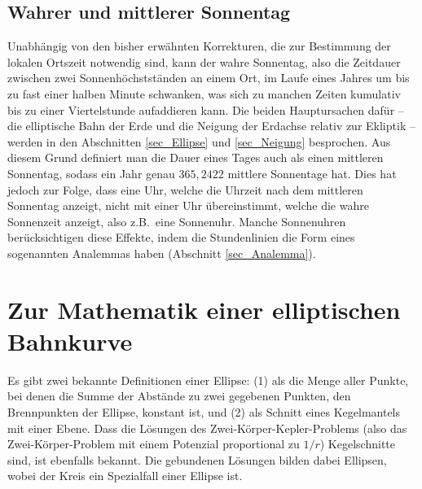 \subsection{Wahrer und mittlerer Sonnentag}
\label{sec_wahrerSonnentag}

Unabh\"angig von den bisher erw\"ahnten Korrekturen, die zur Bestimmung der lokalen
Ortszeit notwendig sind, kann der wahre Sonnentag, also die Zeitdauer zwischen zwei 
Sonnenh\"ochstst\"anden an einem Ort, im Laufe eines Jahres um bis zu fast einer halben Minute
schwanken, was sich zu manchen Zeiten kumulativ bis zu einer Viertelstunde aufaddieren kann. 
Die beiden Hauptursachen daf\"ur -- die elliptische Bahn der Erde und die Neigung der Erdachse 
relativ zur Ekliptik -- werden in den Abschnitten \ref{sec_Ellipse} und \ref{sec_Neigung} besprochen. 
Aus diesem Grund definiert man die Dauer eines Tages auch als einen mittleren 
Sonnentag, 
sodass ein Jahr
genau $365,2422$ mittlere Sonnentage hat. Dies hat jedoch zur Folge, dass eine
Uhr, welche die Uhrzeit nach dem mittleren Sonnentag anzeigt, nicht mit einer Uhr \"ubereinstimmt,
welche die wahre Sonnenzeit anzeigt, also z.B.\ eine Sonnenuhr. 
Manche Sonnenuhren
ber\"ucksichtigen diese Effekte, indem die Stundenlinien die Form eines sogenannten
Analemmas haben (Abschnitt \ref{sec_Analemma}).

\section{Zur Mathematik einer elliptischen Bahnkurve}

Es gibt zwei bekannte Definitionen einer Ellipse: 
(1) als die Menge aller Punkte, bei denen die
Summe der Abst\"ande zu zwei gegebenen Punkten, den Brennpunkten der Ellipse, konstant ist, 
und (2) als Schnitt
eines Kegelmantels mit einer Ebene. Dass die L\"osungen des Zwei-K\"orper-Kepler-Problems
(also das Zwei-K\"orper-Problem mit einem Potenzial proportional zu $1/r$) Kegelschnitte
sind, ist ebenfalls bekannt. Die gebundenen L\"osungen bilden dabei Ellipsen, wobei 
der Kreis ein Spezialfall einer Ellipse ist. 

